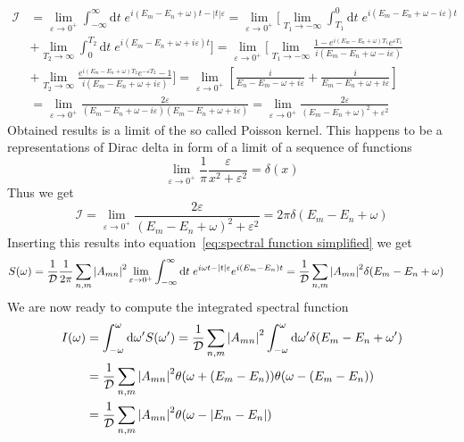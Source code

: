 \begin{align}
    \mathcal{I} &= \lim _{\varepsilon \to 0^+} \int_{-\infty}^{\infty} \mathrm{d} t \; 
    e^{ i (E_m-E_n+\omega)t -|t| \varepsilon} = \lim _{\varepsilon \to 0^+} 
    \Bigg[\lim_{T_1\to -\infty}\int_{T_1}^{0} \mathrm{d} t \; e^{ i (E_m-E_n+\omega -i \varepsilon)t}\nonumber\\
    &+\lim_{T_2\to \infty}\int_{0}^{T_2} \mathrm{d} t \;  e^{ i (E_m-E_n+\omega + i\varepsilon)t}\Bigg]
    = \lim _{\varepsilon \to 0^+} \Bigg[\lim_{T_1\to -\infty} 
    \frac{1-e^{ i (E_m-E_n+\omega )T_1} e^{\varepsilon T_1}}{i (E_m-E_n+\omega -i \varepsilon)}\nonumber\\
     &+ \lim_{T_2\to \infty} \frac{e^{ i (E_m-E_n+\omega )T_2} e^{-\varepsilon T_2}-1}
    {i (E_m-E_n+\omega +i \varepsilon)}\Bigg]
    = \lim _{\varepsilon \to 0^+} \left[\frac{i}{E_n-E_m-\omega +i \varepsilon} + 
    \frac{i}{E_m-E_n+\omega +i \varepsilon} \right]\nonumber\\
     &= \lim _{\varepsilon \to 0^+}
    \frac{2\varepsilon}{(E_m-E_n+\omega -i \varepsilon)(E_m-E_n+\omega +i \varepsilon)}
    =\lim _{\varepsilon \to 0^+} \frac{2\varepsilon}{(E_m-E_n+\omega)^2 +\varepsilon^2}
\end{align}
Obtained results is a limit of the so called Poisson kernel. This happens to be
a representations of Dirac delta in form of a limit of a sequence of functions~\autocite{byron1992mathematics}
\begin{equation}
    \lim _{\varepsilon \to 0^+} \frac{1}{\pi} \frac{\varepsilon}{x^2 +\varepsilon^2} = \delta(x) 
\end{equation}
Thus we get
\begin{equation}
    \mathcal{I} = \lim _{\varepsilon \to 0^+} \frac{2\varepsilon}{(E_m-E_n+\omega)^2 +\varepsilon^2}
    = 2\pi \delta(E_m-E_n+\omega)
\end{equation}
Inserting this results into equation~\eqref{eq:spectral function simplified} we get
\begin{align}
    S(\omega) &= \frac{1}{\mathcal{D}} \frac{1}{2 \pi}\sum_{n,m} \abs{A_{mn}}^2  
    \lim _{\varepsilon \to 0^+} \int_{-\infty}^{\infty} \mathrm{d} t \; e^{i \omega t-|t| 
    \varepsilon}e^{i (E_m-E_n) t} = \frac{1}{\mathcal{D}}\sum_{n,m} \abs{A_{mn}}^2 \delta(E_m-E_n+\omega)
\end{align}
We are now ready to compute the integrated spectral function
\begin{align}
    I(\omega) &= \int_{-\omega}^{\omega} \mathrm{d}\omega^{\prime} S(\omega^{\prime}) =
    \frac{1}{\mathcal{D}}\sum_{n,m} \abs{A_{mn}}^2 \int_{-\omega}^{\omega} \mathrm{d}\omega^{\prime} 
    \delta(E_m-E_n+\omega^{\prime}) \nonumber \\ &= \frac{1}{\mathcal{D}}\sum_{n,m} \abs{A_{mn}}^2
    \theta(\omega + (E_m-E_n))\theta(\omega - (E_m-E_n)) \nonumber\\
    &= \frac{1}{\mathcal{D}}\sum_{n,m} \abs{A_{mn}}^2\theta(\omega - \abs{E_m-E_n})
\end{align}



